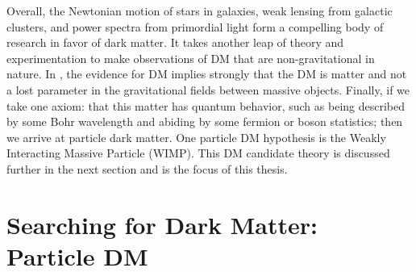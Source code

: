 Overall, the Newtonian motion of stars in galaxies, weak lensing from galactic clusters, and power spectra from primordial light form a compelling body of research in favor of dark matter.
It takes another leap of theory and experimentation to make observations of DM that are non-gravitational in nature.
In , the evidence for DM implies strongly that the DM is matter and not a lost parameter in the gravitational fields between massive objects.
Finally, if we take one axiom: that this matter has quantum behavior, such as being described by some Bohr wavelength and abiding by some fermion or boson statistics; then we arrive at particle dark matter.
One particle DM hypothesis is the Weakly Interacting Massive Particle (WIMP).
This DM candidate theory is discussed further in the next section and is the focus of this thesis.

\section{Searching for Dark Matter: Particle DM}\label{sec:dm_search}

\begin{figure}[ht]
    \label{fig:SM}
\end{figure}

